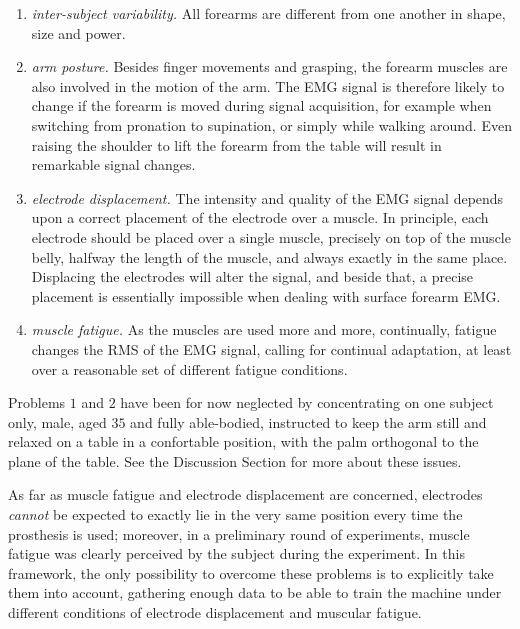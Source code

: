 \begin{enumerate}

  \item \emph{inter-subject variability.} All forearms are different
    from one another in shape, size and power.

  \item \emph{arm posture.} Besides finger movements and grasping, the
    forearm muscles are also involved in the motion of the arm. The
    EMG signal is therefore likely to change if the forearm is moved
    during signal acquisition, for example when switching from
    pronation to supination, or simply while walking around. Even
    raising the shoulder to lift the forearm from the table will
    result in remarkable signal changes.

  \item \emph{electrode displacement.} The intensity and quality of
    the EMG signal depends upon a correct placement of the electrode
    over a muscle. In principle, each electrode should be placed over
    a single muscle, precisely on top of the muscle belly, halfway the
    length of the muscle, and always exactly in the same place.
    Displacing the electrodes will alter the signal, and beside that,
    a precise placement is essentially impossible when dealing with
    surface forearm EMG.

  \item \emph{muscle fatigue.} As the muscles are used more and more,
    continually, fatigue changes the RMS of the EMG signal, calling
    for continual adaptation, at least over a reasonable set of
    different fatigue conditions.

\end{enumerate}

Problems $1$ and $2$ have been for now neglected by concentrating on
one subject only, male, aged $35$ and fully able-bodied, instructed to
keep the arm still and relaxed on a table in a confortable position,
with the palm orthogonal to the plane of the table. See the Discussion
Section for more about these issues.

As far as muscle fatigue and electrode displacement are concerned,
electrodes \emph{cannot} be expected to exactly lie in the very same
position every time the prosthesis is used; moreover, in a preliminary
round of experiments, muscle fatigue was clearly perceived by the
subject during the experiment. In this framework, the only possibility
to overcome these problems is to explicitly take them into account,
gathering enough data to be able to train the machine under different
conditions of electrode displacement and muscular fatigue.

